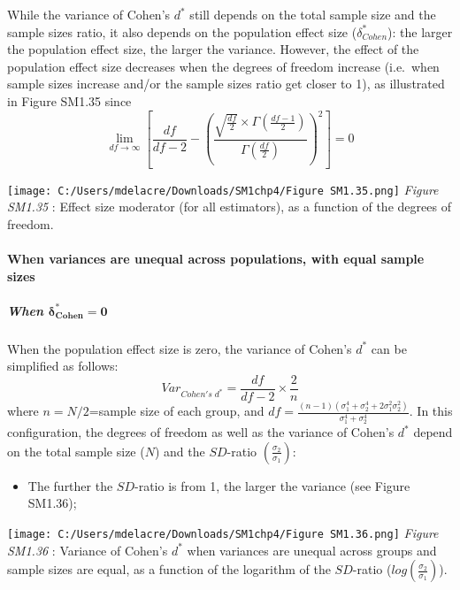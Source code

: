 \documentclass[
  english,
  man,mask,floatsintext]{apa6}
\providecommand{\tightlist}{%
  \setlength{\itemsep}{0pt}\setlength{\parskip}{0pt}}
\let\oldparagraph\paragraph
\renewcommand{\paragraph}[1]{\oldparagraph{#1}\mbox{}}
\let\oldsubparagraph\subparagraph
\renewcommand{\subparagraph}[1]{\oldsubparagraph{#1}\mbox{}}
\begin{document}
While the variance of Cohen's \(d^*\) still depends on the total sample size and the sample sizes ratio, it also depends on the population effect size (\(\delta^*_{Cohen}\)): the larger the population effect size, the larger the variance. However, the effect of the population effect size decreases when the degrees of freedom increase (i.e.~when sample sizes increase and/or the sample sizes ratio get closer to 1), as illustrated in Figure SM1.35 since
\[\lim_{df\rightarrow \infty}\left[\frac{df}{df-2} - \left( \frac{\sqrt{\frac{df}{2}} \times \Gamma \left(\frac{df-1}{2} \right)}{\Gamma \left( \frac{df}{2}\right)}\right)^2 \right]=0\]

\texttt{[image: C:/Users/mdelacre/Downloads/SM1chp4/Figure SM1.35.png]}
\emph{Figure SM1.35} : Effect size moderator (for all estimators), as a function of the degrees of freedom.

\hypertarget{when-variances-are-unequal-across-populations-with-equal-sample-sizes-3}{%
\paragraph{When variances are unequal across populations, with equal sample sizes}\label{when-variances-are-unequal-across-populations-with-equal-sample-sizes-3}}

\hypertarget{when-bmdelta_cohen-0-1}{%
\subparagraph{\texorpdfstring{When \(\bm{\delta^*_{Cohen} = 0}\)}{When \textbackslash bm\{\textbackslash delta\^{}*\_\{Cohen\} = 0\}}}\label{when-bmdelta_cohen-0-1}}

When the population effect size is zero, the variance of Cohen's \(d^*\) can be simplified as follows:
\[Var_{Cohen's \; d^*} = \frac{df}{df-2} \times \frac{2}{n}\]
where \(n=N/2\)=sample size of each group, and \(df=\frac{(n-1)(\sigma^4_1+\sigma^4_2+2\sigma^2_1\sigma^2_2)}{\sigma^4_1+\sigma^4_2}\). In this configuration, the degrees of freedom as well as the variance of Cohen's \(d^*\) depend on the total sample size (\(N\)) and the \(SD\)-ratio \(\left( \frac{\sigma_2}{\sigma_1}\right)\):

\begin{itemize}
\tightlist
\item
  The further the \(SD\)-ratio is from 1, the larger the variance (see Figure SM1.36);
\end{itemize}

\texttt{[image: C:/Users/mdelacre/Downloads/SM1chp4/Figure SM1.36.png]}
\emph{Figure SM1.36} : Variance of Cohen's \(d^*\) when variances are unequal across groups and sample sizes are equal, as a function of the logarithm of the \(SD\)-ratio (\(log \left( \frac{\sigma_2}{\sigma_1} \right)\)).
\end{document}
